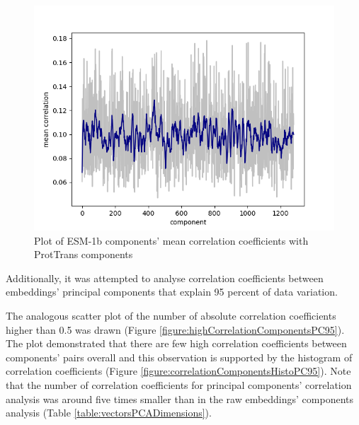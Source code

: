 \documentclass[12pt]{article}
\begin{document}
	\begin{figure}[h!]
		\centering
		\includegraphics[scale=0.85]{validation_small_set_2_joined_correlation_mean.png}

		\caption{Plot of ESM-1b components' mean correlation coefficients 
		with ProtTrans components}
		\label{figure:correlationComponentsMean}
	\end{figure}

	\newpage

	Additionally, it was attempted to analyse correlation coefficients between 
	embeddings' principal components that explain 95 percent of data variation.

	The analogous scatter plot of the number of absolute correlation 
	coefficients higher than 0.5 was drawn
	(Figure \ref{figure:highCorrelationComponentsPC95}). The plot 
	demonstrated that there are few high correlation coefficients 
	between components' pairs overall and this observation is supported 
	by the histogram of correlation coefficients 
	(Figure \ref{figure:correlationComponentsHistoPC95}). Note that the 
	number of correlation coefficients for principal components' correlation 
	analysis was around five times smaller than in the raw embeddings' components
	analysis (Table \ref{table:vectorsPCADimensions}).
\end{document}

